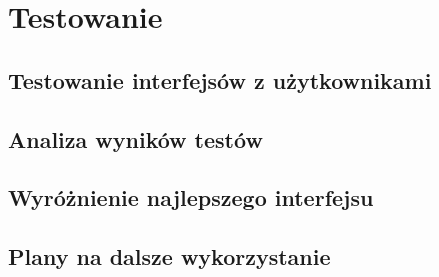 \chapter{Testowanie}
\section{Testowanie interfejsów z użytkownikami}
\section{Analiza wyników testów}
\section{Wyróżnienie najlepszego interfejsu}
\section{Plany na dalsze wykorzystanie}